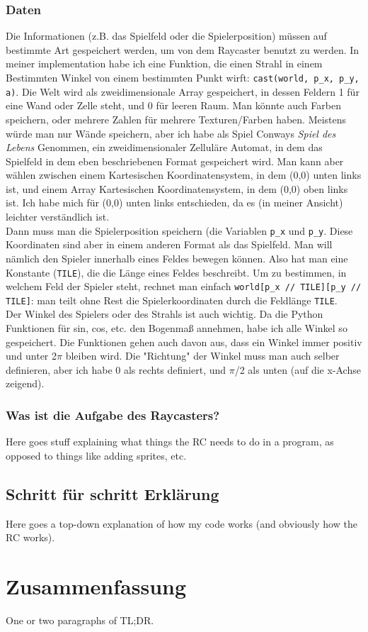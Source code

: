 \documentclass[a4paper,12pt]{report}
\begin{document}
\subsubsection{Daten}
Die Informationen (z.B. das Spielfeld oder die Spielerposition) müssen auf bestimmte Art gespeichert werden, um von dem Raycaster benutzt zu werden. In meiner implementation habe ich eine Funktion, die einen Strahl in einem Bestimmten Winkel von einem bestimmten Punkt wirft: \texttt{cast(world, p\_x, p\_y, a)}. Die Welt wird als zweidimensionale Array gespeichert, in dessen Feldern 1 für eine Wand oder Zelle steht, und 0 für leeren Raum. Man könnte auch Farben speichern, oder mehrere Zahlen für mehrere Texturen/Farben haben. Meistens würde man nur Wände speichern, aber ich habe als Spiel Conways \textit{Spiel des Lebens} Genommen, ein zweidimensionaler Zelluläre Automat, in dem das Spielfeld in dem eben beschriebenen Format gespeichert wird. Man kann aber wählen zwischen einem Kartesischen Koordinatensystem, in dem (0,0) unten links ist, und einem Array Kartesischen Koordinatensystem, in dem (0,0) oben links ist. Ich habe mich für (0,0) unten links entschieden, da es (in meiner Ansicht) leichter verständlich ist. \\
Dann muss man die Spielerposition speichern (die Variablen \texttt{p\_x} und \texttt{p\_y}. Diese Koordinaten sind aber in einem anderen Format als das Spielfeld. Man will nämlich den Spieler innerhalb eines Feldes bewegen können. Also hat man eine Konstante (\texttt{TILE}), die die Länge eines Feldes beschreibt. Um zu bestimmen, in welchem Feld der Spieler steht, rechnet man einfach \texttt{world[p\_x // TILE][p\_y // TILE]}: man teilt ohne Rest die Spielerkoordinaten durch die Feldlänge \texttt{TILE}. \\
Der Winkel des Spielers oder des Strahls ist auch wichtig. Da die Python Funktionen für sin, cos, etc. den Bogenmaß annehmen, habe ich alle Winkel so gespeichert. Die Funktionen gehen auch davon aus, dass ein Winkel immer positiv und unter 2$\pi$ bleiben wird. Die "Richtung" der Winkel muss man auch selber definieren, aber ich habe 0 als rechts definiert, und $\pi$/2 als unten (auf die x-Achse zeigend).
\subsubsection{Was ist die Aufgabe des Raycasters?}
Here goes stuff explaining what things the RC needs to do in a program, as opposed to things like adding sprites, etc.

\subsection{Schritt für schritt Erklärung}
Here goes a top-down explanation of how my code works (and obviously how the RC works).

\section{Zusammenfassung}
One or two paragraphs of TL;DR.
\end{document}
